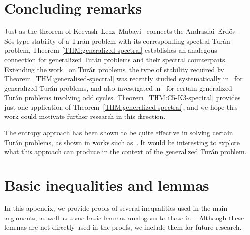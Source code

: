 \documentclass[11pt,a4paper]{article}
\begin{document}
\section{Concluding remarks}\label{SEC:remark}
%
Just as the theorem of Keevash--Lenz--Mubayi~\cite{KLM14} connects the {A}ndr{\'{a}}sfai--{E}rd{\H o}s--{S}{\'{o}}s-type stability of a Tur\'{a}n problem with its corresponding spectral Tur\'{a}n problem, Theorem~\ref{THM:generalized-spectral} establishes an analogous connection for generalized Tur\'{a}n problems and their spectral counterparts.
Extending the work~\cite{LMR23unified,HLZ24} on Tur\'{a}n problems, the type of stability required by Theorem~\ref{THM:generalized-spectral} was recently studied systematically in~\cite{CL24,CILLP24} for generalized Tur\'{a}n problems, and also investigated in~\cite{CHL24} for certain generalized Tur\'{a}n problems involving odd cycles.
Theorem~\ref{THM:C5-K3-spectral} provides just one application of Theorem~\ref{THM:generalized-spectral}, and we hope this work could motivate further research in this direction.


The entropy approach has been shown to be quite effective in solving certain Tur\'{a}n problems, as shown in works such as~\cite{CY24,L25}. It would be interesting to explore what this approach can produce in the context of the generalized Tur\'{a}n problem.
%

\appendix
\section{Basic inequalities and lemmas}
In this appendix, we provide proofs of several inequalities used in the main arguments, as well as some basic lemmas analogous to those in~\cite{KLM14}. Although these lemmas are not directly used in the proofs, we include them for future research.
\end{document}
